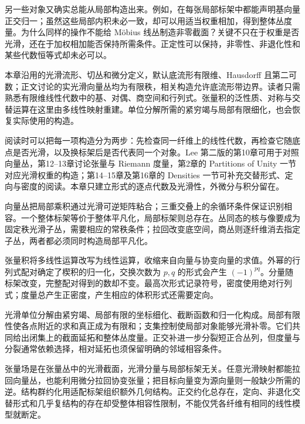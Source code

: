 另一些对象又确实总能从局部构造出来。例如，在每张局部标架中都能声明基向量正交归一；虽然这些局部内积未必一致，却可以用适当权重相加，得到整体丛度量。为什么同样的操作不能给 Möbius 线丛制造非零截面？关键不只在于权重是否光滑，还在于加权相加能否保持所需条件。正定性可以保持，非零性、非退化性和某些代数恒等式却未必可以。

\ProseParagraphBreak

本章沿用的光滑流形、切丛和微分定义，默认底流形有限维、Hausdorff 且第二可数；正文讨论的实光滑向量丛均为有限秩，相关构造允许底流形带边界。读者只需熟悉有限维线性代数中的基、对偶、商空间和行列式。张量积的泛性质、对称与交替运算在这里由多线性映射重建。单位分解所需的紧穷竭与局部有限细化，也会恢复实际使用的构造。

\ProseParagraphBreak

阅读时可以把每一项构造分为两步：先检查同一纤维上的线性代数，再检查它随底点是否光滑，以及换标架后是否代表同一个对象。Lee 第二版的第10章可用于对照向量丛，第12--13章讨论张量与 Riemann 度量，第2章的 Partitions of Unity 一节对应光滑权重的构造；第14--15章及第16章的 Densities 一节可补充交替形式、定向与密度的阅读\cite[第40--47、249--271、304--399、427--433页]{Lee2012Smooth}。本章只建立形式的逐点代数及光滑性，外微分与积分留在。






\begin{chaptersummary}
	向量丛把局部乘积通过光滑可逆矩阵粘合；三重交叠上的余循环条件保证识别相容。一个整体标架等价于整体平凡化，局部标架则总存在。丛同态的核与像要成为固定秩光滑子丛，需要相应的常秩条件；拉回改变底空间，商丛则逐纤维消去指定子丛，两者都必须同时构造局部平凡化。

	\ProseParagraphBreak

	张量积将多线性运算改写为线性运算，收缩来自向量与协变向量的求值。外幂的行列式配对确定了楔积的归一化，交换次数为 \(p,q\) 的形式会产生 \((-1)^{pq}\)。分量随标架改变，完整配对得到的数却不变。最高次形式记录符号，密度使用绝对行列式；度量总产生正密度，产生相应的体积形式还需要定向。

	\ProseParagraphBreak

	光滑单位分解由紧穷竭、局部有限的坐标细化、截断函数和归一化构成。局部有限性使各点附近的求和真正成为有限和；支集控制使局部对象能够光滑补零。它们共同给出闭集上的截面延拓和整体丛度量。正交补进一步分裂短正合丛列，但度量与分裂通常依赖选择，相对延拓也须保留明确的邻域相容条件。

	\ProseParagraphBreak

	张量场是在张量丛中的光滑截面，光滑分量与局部标架无关。任意光滑映射都能拉回向量丛，也能利用微分拉回协变张量；把目标向量变为源向量则一般缺少所需的逆。结构群约化用适配标架组织额外几何结构。正交约化总存在，定向、非退化交替形式和几乎复结构的存在却受整体相容性限制，不能仅凭各纤维有相同的线性模型就断定。
\end{chaptersummary}

